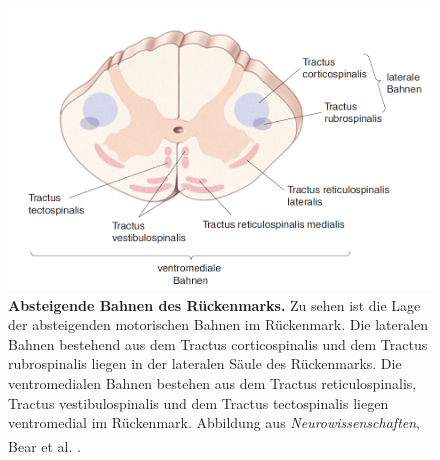 \documentclass[12pt,a4paper,pdftex]{article}
\begin{document}
\begin{figure}[H]
    \centering
    \includegraphics[width=1\textwidth]{pictures/Bilder_Laura/absteigende_bahnen_rkm.png}
    \caption[Absteigende Bahnen des Rückenmarks]{\textbf{Absteigende Bahnen des Rückenmarks.} Zu sehen ist die Lage der absteigenden motorischen Bahnen im Rückenmark. Die lateralen Bahnen bestehend aus dem Tractus corticospinalis und dem Tractus rubrospinalis liegen in der lateralen Säule des Rückenmarks. Die ventromedialen Bahnen bestehen aus dem Tractus reticulospinalis, Tractus vestibulospinalis und dem Tractus tectospinalis  liegen ventromedial im Rückenmark. Abbildung aus \textit{Neurowissenschaften}, Bear et al. \textsuperscript{\cite[14]{neurowissenschaften_baer}}.}
    \label{fig:abst_Rueckenmark}
\end{figure}
\end{document}

